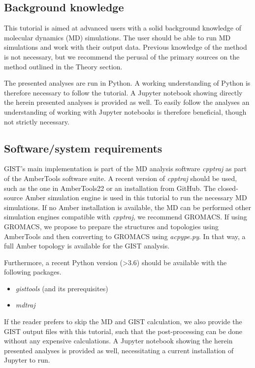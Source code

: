 \documentclass[9pt,tutorial]{livecoms}
\newcommand{\software}{\emph}
\begin{document}
\subsection{Background knowledge}
This tutorial is aimed at advanced users with a solid background knowledge of molecular dynamics (MD) simulations. The user should be able to run MD simulations and work with their output data.
Previous knowledge of the method is not necessary, but we recommend the perusal of the primary sources on the method outlined in the Theory section. 

The presented analyses are run in Python.
A working understanding of Python is therefore necessary to follow the tutorial. 
A Jupyter notebook showing directly the herein presented analyses is provided as well. 
To easily follow the analyses an understanding of working with Jupyter notebooks is therefore beneficial, though not strictly necessary.

\subsection{Software/system requirements}
GIST's main implementation is part of the MD analysis software \software{cpptraj} as part of the AmberTools software suite.
A recent version of \software{cpptraj} should be used, such as the one in AmberTools22 or an installation from GitHub.
The closed-source Amber simulation engine is used in this tutorial to run the necessary MD simulations. 
If no Amber installation is available, the MD can be performed other simulation engines compatible with \software{cpptraj}, we recommend GROMACS.
If using GROMACS, we propose to prepare the structures and topologies using AmberTools and then converting to GROMACS using \software{acpype.py}.
In that way, a full Amber topology is available for the GIST analysis.

Furthermore, a recent Python version (>3.6) should be available with the following packages.
\begin{itemize}
	\item \software{gisttools} (and its prerequisites)
	\item \software{mdtraj}
\end{itemize}
If the reader prefers to skip the MD and GIST calculation, we also provide the GIST output files with this tutorial, such that the post-processing can be done without any expensive calculations. A Jupyter notebook showing the herein presented analyses is provided as well, necessitating a current installation of Jupyter to run.
\end{document}
